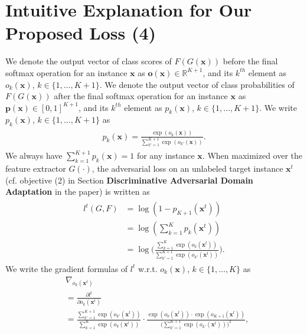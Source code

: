 \documentclass[letterpaper]{article} \usepackage{aaai20}  \usepackage{times}  \usepackage{helvet} \usepackage{courier}  \usepackage[hyphens]{url}  \usepackage{graphicx} \urlstyle{rm} \def\UrlFont{\rm}  \usepackage{graphicx}  \frenchspacing  \setlength{\pdfpagewidth}{8.5in}  \setlength{\pdfpageheight}{11in}
\begin{document}
\section{Intuitive Explanation for Our Proposed Loss (4)}
\label{sec2}
We denote the output vector of class scores of $F(G(\mathbf{x}))$ before the final softmax operation for an instance $\mathbf{x}$ as $\mathbf{o}(\mathbf{x}) \in \mathbb{R}^{K+1}$, and its $k^{th}$ element as $o_k(\mathbf{x})$, $k \in \{1,\dots, K+1\}$. We denote the output vector of class probabilities of $F(G(\mathbf{x}))$ after the final softmax operation for an instance $\mathbf{x}$ as $\mathbf{p}(\mathbf{x}) \in [0,1]^{K+1}$, and its $k^{th}$ element as $p_k(\mathbf{x})$, $k \in \{1,\dots, K+1\}$. We write $p_k(\mathbf{x})$, $k \in \{1,\dots, K+1\}$ as 
\begin{eqnarray}\label{EqnSoftmax}
\begin{aligned}
p_k(\mathbf{x}) = \frac{\exp(o_k(\mathbf{x}))}{\sum_{k'=1}^{K+1}\exp(o_{k'}(\mathbf{x}))}. 
\end{aligned}
\end{eqnarray}
We always have $\sum_{k=1}^{K+1} p_k(\mathbf{x}) = 1$ for any instance $\mathbf{x}$. When maximized over the feature extractor $G(\cdot)$, the adversarial loss on an unlabeled target instance $\mathbf{x}^t$ (cf. objective (2) in Section \textbf{Discriminative Adversarial Domain Adaptation} in the paper) is written as 
\begin{eqnarray}\label{EqnTarAdvLoss}
\begin{aligned}
{l}^t(G, F) &  = \log(1-p_{K+1}(\mathbf{x}^t)) 
\\ & = \log(\sum_{k=1}^K p_k(\mathbf{x}^t)) 
\\ & = \log\Big(\frac{\sum_{k=1}^{K} \exp(o_k(\mathbf{x}^t))}{\sum_{k'=1}^{K+1} \exp(o_{k'}(\mathbf{x}^t))}\Big). 
\end{aligned}
\end{eqnarray}
We write the gradient formulas of ${l}^t$ w.r.t. $o_k(\mathbf{x})$, $k \in \{1, \dots, K\}$ as 
\begin{align}
&\nabla_{o_k(\mathbf{x}^t)} \nonumber \\ & = \frac{\partial {l}^t}{\partial o_{k}(\mathbf{x}^t)} \nonumber
\\ & = \frac{\sum_{k'=1}^{K+1} \exp(o_{k'}(\mathbf{x}^t))}{\sum_{k=1}^{K} \exp(o_k(\mathbf{x}^t))} \cdot \frac{\exp(o_k(\mathbf{x}^t))\cdot\exp(o_{K+1}(\mathbf{x}^t))}{\Big(\sum_{k'=1}^{K+1} \exp(o_{k'}(\mathbf{x}^t))\Big)^2}, 
\end{align}
\end{document}

